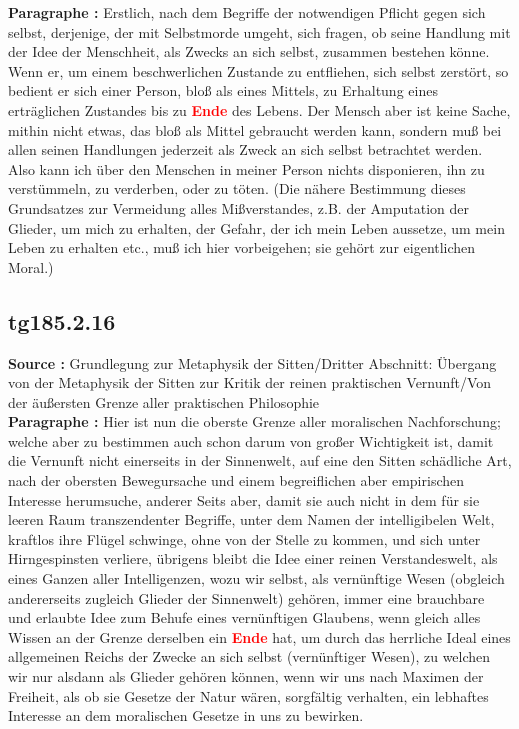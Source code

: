 \documentclass[a4paper,12pt,twoside]{book}
\newcommand{\match}[1]{\textcolor{red}{\textbf{#1}}}
\begin{document}
	\noindent\textbf{Paragraphe : }
	Erstlich, nach dem Begriffe der notwendigen Pflicht gegen sich selbst, derjenige, der mit Selbstmorde umgeht, sich fragen, ob seine Handlung mit der Idee der Menschheit, als Zwecks an sich selbst, zusammen bestehen könne. Wenn er, um einem beschwerlichen Zustande zu entfliehen, sich selbst zerstört, so bedient er sich einer Person, bloß als eines Mittels, zu Erhaltung eines erträglichen Zustandes bis zu \match{Ende} des Lebens. Der Mensch aber ist keine Sache, mithin nicht etwas, das bloß als Mittel gebraucht werden kann, sondern muß bei allen seinen Handlungen jederzeit als Zweck an sich selbst betrachtet werden. Also kann ich über den Menschen in meiner Person nichts disponieren, ihn zu verstümmeln, zu verderben, oder zu töten. (Die nähere Bestimmung dieses Grundsatzes zur Vermeidung alles Mißverstandes, z.B. der Amputation der Glieder, um mich zu erhalten, der Gefahr, der ich mein Leben aussetze, um mein Leben zu erhalten etc., muß ich hier vorbeigehen; sie gehört zur eigentlichen Moral.) 
	
	\subsection*{tg185.2.16} 
	\textbf{Source : }Grundlegung zur Metaphysik der Sitten/Dritter Abschnitt: Übergang von der Metaphysik der Sitten zur Kritik der reinen praktischen Vernunft/Von der äußersten Grenze aller praktischen Philosophie\\  
	
	\noindent\textbf{Paragraphe : }Hier ist nun die oberste Grenze aller moralischen Nachforschung; welche aber zu bestimmen auch schon darum von großer Wichtigkeit ist, damit die Vernunft nicht einerseits in der Sinnenwelt, auf eine den Sitten schädliche Art, nach der obersten Bewegursache und einem begreiflichen aber empirischen Interesse herumsuche, anderer Seits aber, damit sie auch nicht in dem für sie leeren Raum transzendenter Begriffe, unter dem Namen der intelligibelen Welt, kraftlos ihre Flügel schwinge, ohne von der Stelle zu kommen, und sich unter Hirngespinsten verliere, übrigens bleibt die Idee einer reinen Verstandeswelt, als eines Ganzen aller Intelligenzen, wozu wir selbst, als vernünftige Wesen (obgleich andererseits zugleich Glieder der Sinnenwelt) gehören, immer eine brauchbare und erlaubte Idee zum Behufe eines vernünftigen Glaubens, wenn gleich alles Wissen an der Grenze derselben ein \match{Ende} hat, um durch das  herrliche Ideal eines allgemeinen Reichs der Zwecke an sich selbst (vernünftiger Wesen), zu welchen wir nur alsdann als Glieder gehören können, wenn wir uns nach Maximen der Freiheit, als ob sie Gesetze der Natur wären, sorgfältig verhalten, ein lebhaftes Interesse an dem moralischen Gesetze in uns zu bewirken. 
	
\end{document}
